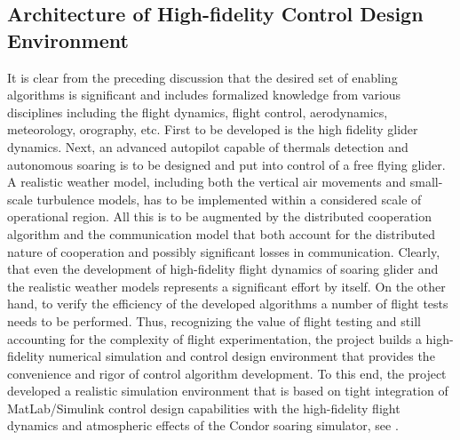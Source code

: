 \documentclass[letterpaper, 10 pt, conference]{ieeeconf}  %
\newcommand{\squeezeup}{\vspace{-1.0mm}}
\begin{document}
\subsection{Architecture of High-fidelity Control Design Environment}
\squeezeup
It is clear from the preceding discussion that the desired set of enabling algorithms is significant and includes formalized knowledge from various disciplines including the flight dynamics, flight control, aerodynamics, meteorology, orography, etc. First to be developed is the high fidelity glider dynamics. Next, an advanced autopilot capable of thermals detection and autonomous soaring is to be designed and put into control of a free flying glider. A realistic weather model, including both the vertical air movements and small-scale turbulence models, has to be implemented within a considered scale of operational region. All this is to be augmented by the distributed cooperation algorithm and the communication model that both account for the distributed nature of cooperation and possibly significant losses in communication. Clearly, that even the development of high-fidelity flight dynamics of soaring glider and the realistic weather models represents a significant effort by itself. On the other hand, to verify the efficiency of the developed algorithms a number of flight tests needs to be performed. Thus,  recognizing the value of flight testing and still accounting for the complexity of flight experimentation, the project builds a high-fidelity numerical simulation and control design environment that provides the convenience and rigor of control algorithm development. To this end, the project developed a realistic simulation environment that is based on tight integration of MatLab/Simulink \cite{MATLAB:2013} control design capabilities with the high-fidelity flight dynamics and atmospheric effects of the Condor soaring simulator, see \cite{Condor:2013:Online}.
\end{document}
